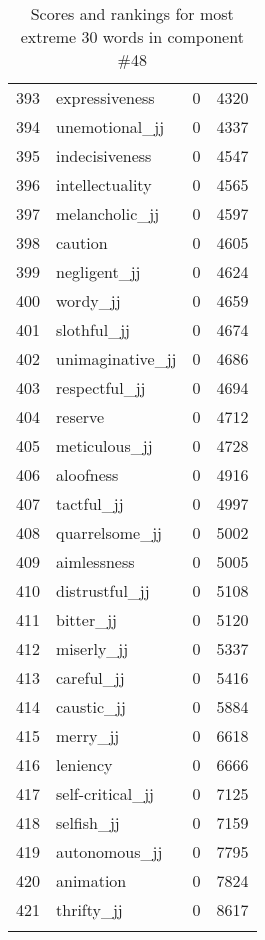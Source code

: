 \begin{longtable}[!htbp]{| rlr@{.}l |}
    393 & expressiveness & 0 & 4320 \\
    394 & unemotional\_jj & 0 & 4337 \\
    395 & indecisiveness & 0 & 4547 \\
    396 & intellectuality & 0 & 4565 \\
    397 & melancholic\_jj & 0 & 4597 \\
    398 & caution & 0 & 4605 \\
    399 & negligent\_jj & 0 & 4624 \\
    400 & wordy\_jj & 0 & 4659 \\
    401 & slothful\_jj & 0 & 4674 \\
    402 & unimaginative\_jj & 0 & 4686 \\
    403 & respectful\_jj & 0 & 4694 \\
    404 & reserve & 0 & 4712 \\
    405 & meticulous\_jj & 0 & 4728 \\
    406 & aloofness & 0 & 4916 \\
    407 & tactful\_jj & 0 & 4997 \\
    408 & quarrelsome\_jj & 0 & 5002 \\
    409 & aimlessness & 0 & 5005 \\
    410 & distrustful\_jj & 0 & 5108 \\
    411 & bitter\_jj & 0 & 5120 \\
    412 & miserly\_jj & 0 & 5337 \\
    413 & careful\_jj & 0 & 5416 \\
    414 & caustic\_jj & 0 & 5884 \\
    415 & merry\_jj & 0 & 6618 \\
    416 & leniency & 0 & 6666 \\
    417 & self-critical\_jj & 0 & 7125 \\
    418 & selfish\_jj & 0 & 7159 \\
    419 & autonomous\_jj & 0 & 7795 \\
    420 & animation & 0 & 7824 \\
    421 & thrifty\_jj & 0 & 8617 \\
    \hline
    \caption{Scores and rankings for most extreme 30 words in component \#48} \\
\end{longtable}
